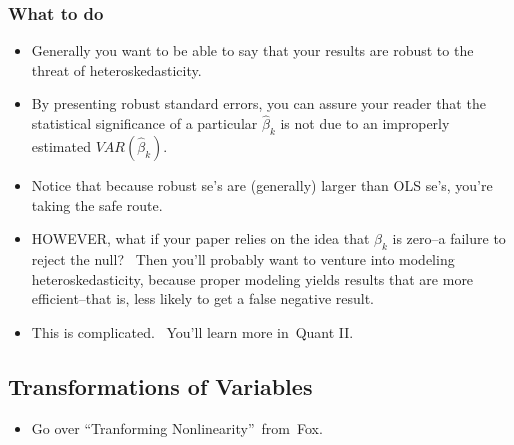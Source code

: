 \documentclass[11pt]{article}
\begin{document}
\subsubsection{What to do}

\begin{itemize}
\item Generally you want to be able to say that your results are robust to
the threat of heteroskedasticity.

\item By presenting robust standard errors, you can assure your reader that
the statistical significance of a particular $\widehat{\beta }_{k}$ is not
due to an improperly estimated $VAR\left( \widehat{\beta }_{k}\right) $.

\item Notice that because robust se's are (generally) larger than OLS se's,
you're taking the safe route.

\item HOWEVER, what if your paper relies on the idea that $\beta _{k}$ is
zero--a failure to reject the null? \ Then you'll probably want to venture
into modeling heteroskedasticity, because proper modeling yields results
that are more efficient--that is, less likely to get a false negative result.

\item This is complicated. \ You'll learn more in\ Quant II.
\end{itemize}

\subsection{Transformations of Variables}

\begin{itemize}
\item Go over \textquotedblleft Tranforming Nonlinearity\textquotedblright\
from\ Fox.
\end{itemize}
\end{document}
